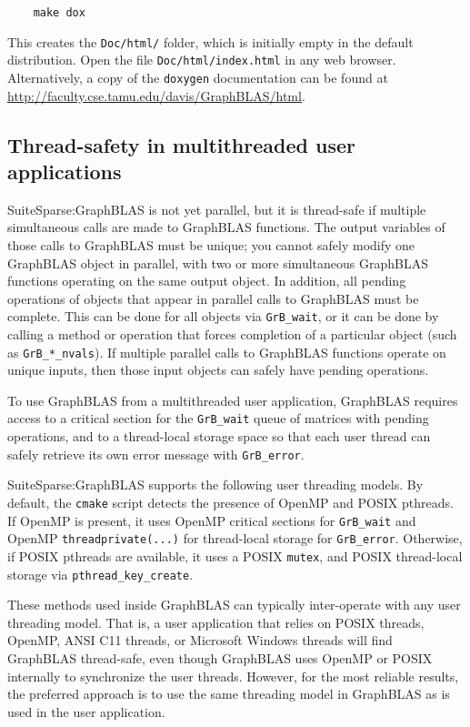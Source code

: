 \documentclass[12pt]{article}
\begin{document}
    {\small
    \begin{verbatim}
    make dox\end{verbatim} }

This creates the \verb'Doc/html/' folder, which is initially empty in
the default distribution.  Open the file \verb'Doc/html/index.html' in
any web browser.  Alternatively, a copy of the \verb'doxygen' documentation can
be found at \url{http://faculty.cse.tamu.edu/davis/GraphBLAS/html}.

\subsection{Thread-safety in multithreaded user applications}
\label{sec:threads}

SuiteSparse:GraphBLAS is not yet parallel, but it is thread-safe if multiple
simultaneous calls are made to GraphBLAS functions.  The output variables of
those calls to GraphBLAS must be unique; you cannot safely modify one GraphBLAS
object in parallel, with two or more simultaneous GraphBLAS functions operating
on the same output object.  In addition, all pending operations of objects that
appear in parallel calls to GraphBLAS must be complete.  This can be done for
all objects via \verb'GrB_wait', or it can be done by calling a method or
operation that forces completion of a particular object (such as
\verb'GrB_*_nvals').  If multiple parallel calls to GraphBLAS functions operate
on unique inputs, then those input objects can safely have pending operations.

To use GraphBLAS from a multithreaded user application, GraphBLAS
requires access to a critical section for the \verb'GrB_wait' queue of
matrices with pending operations, and to a thread-local storage space
so that each user thread can safely retrieve its own error message with
\verb'GrB_error'.

SuiteSparse:GraphBLAS supports the following user threading models.  By
default, the \verb'cmake' script detects the presence of OpenMP and POSIX
pthreads.  If OpenMP is present, it uses OpenMP critical sections for
\verb'GrB_wait' and OpenMP \verb'threadprivate(...)' for thread-local storage
for \verb'GrB_error'.  Otherwise, if POSIX pthreads are available, it uses a
POSIX \verb'mutex', and POSIX thread-local storage via
\verb'pthread_key_create'.

These methods used inside GraphBLAS can typically inter-operate with any user
threading model.  That is, a user application that relies on POSIX threads,
OpenMP, ANSI C11 threads, or Microsoft Windows threads will find GraphBLAS
thread-safe, even though GraphBLAS uses OpenMP or POSIX internally to
synchronize the user threads.  However, for the most reliable results, the
preferred approach is to use the same threading model in GraphBLAS as is used
in the user application.
\end{document}
